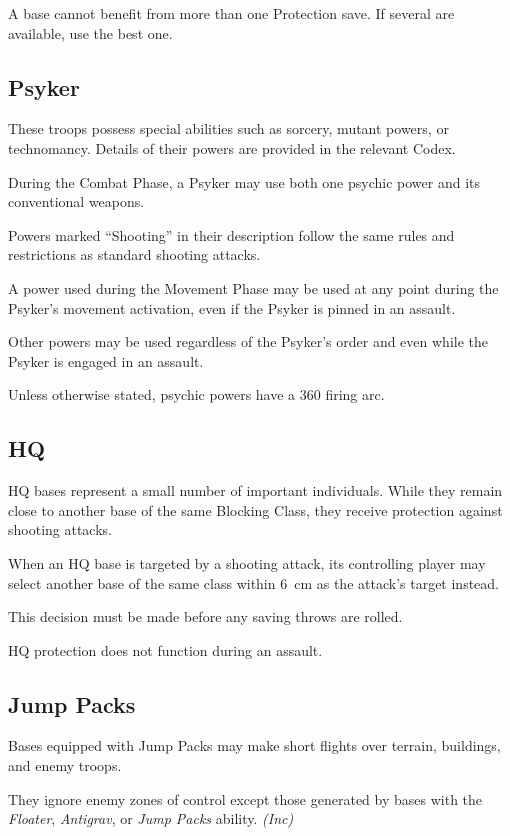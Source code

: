 A base cannot benefit from more than one Protection save. If several are available, use the best one.

\subsection{Psyker}

These troops possess special abilities such as sorcery, mutant powers, or technomancy. Details of their powers are provided in the relevant Codex.

During the Combat Phase, a Psyker may use both one psychic power and its conventional weapons.

Powers marked ``Shooting'' in their description follow the same rules and restrictions as standard shooting attacks.

A power used during the Movement Phase may be used at any point during the Psyker's movement activation, even if the Psyker is pinned in an assault.

Other powers may be used regardless of the Psyker's order and even while the Psyker is engaged in an assault.

Unless otherwise stated, psychic powers have a 360\textdegree{} firing arc.

\subsection{HQ}

HQ bases represent a small number of important individuals. While they remain close to another base of the same Blocking Class, they receive protection against shooting attacks.

When an HQ base is targeted by a shooting attack, its controlling player may select another base of the same class within 6~cm as the attack's target instead.

This decision must be made before any saving throws are rolled.

HQ protection does not function during an assault.

\subsection{Jump Packs}

Bases equipped with Jump Packs may make short flights over terrain, buildings, and enemy troops.

They ignore enemy zones of control except those generated by bases with the \textit{Floater}, \textit{Antigrav}, or \textit{Jump Packs} ability. \textit{(Inc)}


